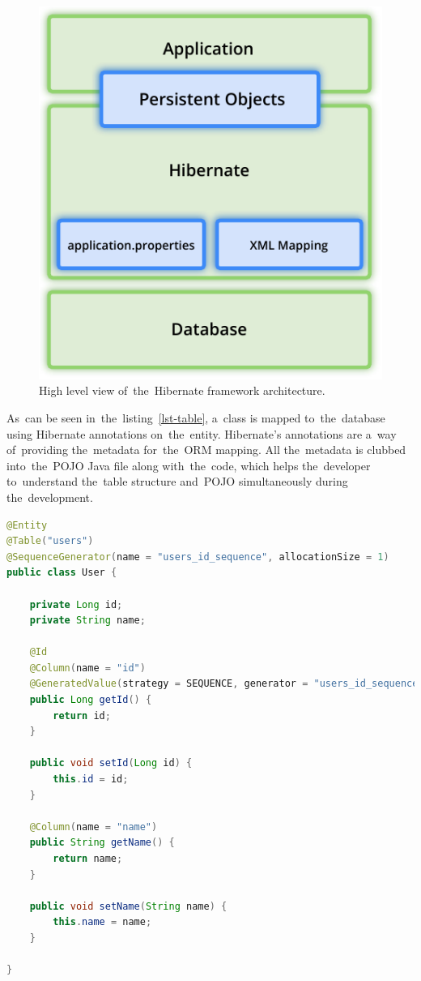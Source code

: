 \begin{figure}[!hbt]
	\centering
	\includegraphics[scale=0.8]{./figures/hibernate-architecture.pdf}
	\caption{High level view of~the~Hibernate framework architecture.}
\end{figure}

As~can be seen in~the~listing~\ref{lst-table}, a~class is mapped to~the~database
using Hibernate annotations on~the~entity. Hibernate's annotations are a~way
of~providing the~metadata for~the~ORM mapping. All the~metadata is clubbed
into~the~POJO Java file along with~the~code, which helps the~developer
to~understand the~table structure and~POJO simultaneously during
the~development.

\vspace{1mm}
\begin{lstlisting}[caption=POJO class that features the~advantages of~ORM.,
style=dp-default, language=Java, label=lst-table]
@Entity
@Table("users")
@SequenceGenerator(name = "users_id_sequence", allocationSize = 1)
public class User {

	private Long id;
	private String name;
	
	@Id
	@Column(name = "id")
	@GeneratedValue(strategy = SEQUENCE, generator = "users_id_sequence")
	public Long getId() {
		return id;
	}
	
	public void setId(Long id) {
		this.id = id;
	}
	
	@Column(name = "name")
	public String getName() {
		return name;
	}
	
	public void setName(String name) {
		this.name = name;
	}

}
\end{lstlisting}

